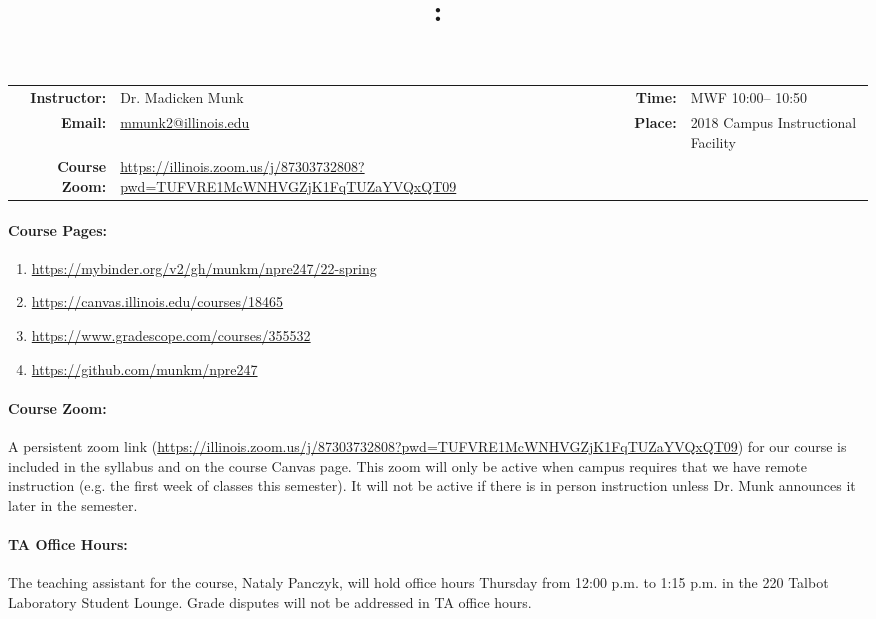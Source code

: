 \documentclass[11pt, a4paper]{article}
\title{\CourseNumber: \CourseTitle\\}
\author{\CourseUniversity}
\date{\CourseSemester \CourseYear}
\makeatletter
\newcommand{\CourseInstructor}{Dr. Madicken Munk\xspace}%
\newcommand{\CourseDays}{MWF\xspace}%
\newcommand{\CourseStart}{10:00\xspace}%
\newcommand{\CourseEnd}{10:50\xspace}%
\newcommand{\CourseInstructorEmail}{mmunk2@illinois.edu}
\newcommand{\CourseRoom}{2018\xspace}%
\newcommand{\CourseBuilding}{Campus Instructional Facility\xspace}%
\newcommand{\CourseZoom}{https://illinois.zoom.us/j/87303732808?pwd=TUFVRE1McWNHVGZjK1FqTUZaYVQxQT09}%
\newcommand{\TeachingAssistant}{Nataly Panczyk\xspace}%
\newcommand{\TAOfficeHourDays}{Thursday \xspace}%
\newcommand{\TAOfficeHourStart}{12:00 p.m.\xspace}%
\newcommand{\TAOfficeHourEnd}{1:15 p.m.\xspace}%
\newcommand{\TAOfficeHourPlace}{the 220 Talbot Laboratory Student Lounge\xspace}
\makeatother
\begin{document}
\maketitle
\renewcommand{\arraystretch}{1.5}
\begin{center}
\begin{table}[h]
\begin{tabularx}{\textwidth}{rXrX}
\hline
\textbf{Instructor:} & \CourseInstructor & \textbf{Time:} & \CourseDays \CourseStart -- \CourseEnd \\
\textbf{Email:} &  \href{mailto:\CourseInstructorEmail}{\CourseInstructorEmail} & \textbf{Place:} & \CourseRoom \CourseBuilding\\
\textbf{Course Zoom:} & \url{\CourseZoom} & & \\
\hline
\end{tabularx}
\end{table}
\end{center}

\paragraph{Course Pages:}
\begin{enumerate}
        \item \url{https://mybinder.org/v2/gh/munkm/npre247/22-spring}
        \item \url{https://canvas.illinois.edu/courses/18465}
        \item \url{https://www.gradescope.com/courses/355532}
        \item \url{https://github.com/munkm/npre247}
\end{enumerate}

\paragraph{Course Zoom:} A persistent zoom link (\url{\CourseZoom})
for our course is included in
the syllabus and on the course Canvas page.
This zoom will only be active when campus
requires that we have remote instruction (e.g. the first week of classes this
semester). It will not be active if there is in person instruction unless Dr.
Munk announces it later in the semester.

\paragraph{TA Office Hours:} The teaching assistant for the course,
\TeachingAssistant, will hold office hours \TAOfficeHourDays from
\TAOfficeHourStart to \TAOfficeHourEnd in \TAOfficeHourPlace.
Grade disputes will not be addressed in TA office hours.
\end{document}
